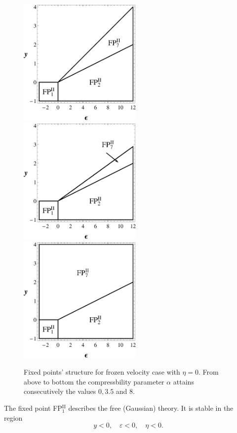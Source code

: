 \documentclass[aps,pre,url,twocolumn,superscriptaddress]{revtex4-1}
\def\eps{\varepsilon}
\newcommand{\fp}[2]{FP$^{\textrm{#1}}_{#2}$}
\begin{document}
\begin{figure}[h!]
  \includegraphics[width=6cm]{FVF_0_0.eps}
  \includegraphics[width=6cm]{FVF_0_3-5.eps}
  \includegraphics[width=6cm]{FVF_0_8.eps}
  \caption{Fixed points' structure for frozen velocity case
        with $\eta=0$.
	From above to bottom the compressbility parameter $\alpha$ attains
	consecutively the values $0,3.5$ and $8$.}
  \label{fig:FVF_struct}	
\end{figure}
The fixed point \fp{II}{1} describes the free (Gaussian) theory. It is stable in the region
\begin{equation}
   y<0,\quad \eps < 0, \quad \eta < 0.
   \label{eq:free_frozen} 
\end{equation}
\end{document}
